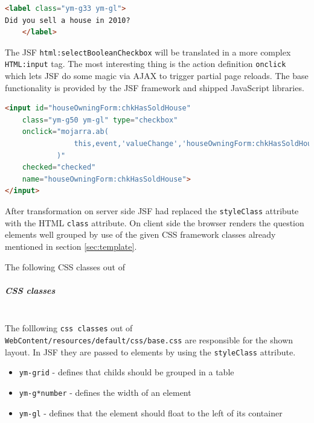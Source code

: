 \begin{lstlisting}[language=HTML]
<label class="ym-g33 ym-gl">
Did you sell a house in 2010?
    </label>
\end{lstlisting}

The JSF \texttt{html:selectBooleanCheckbox} will be translated in a more complex
\texttt{HTML:input} tag. The most interesting thing is the action definition
\texttt{onclick} which lets JSF do some magic via AJAX to trigger partial page
reloads. The base functionality is provided by the JSF framework and shipped
JavaScript libraries.

\begin{lstlisting}[language=HTML]
<input id="houseOwningForm:chkHasSoldHouse" 
	class="ym-g50 ym-gl" type="checkbox"
	onclick="mojarra.ab(
				this,event,'valueChange','houseOwningForm:chkHasSoldHouse','houseOwningForm:grp_hasSoldHouse_hasBoughtHouse'
			)"
	checked="checked" 
	name="houseOwningForm:chkHasSoldHouse">
</input>
\end{lstlisting}

After transformation on server side JSF had replaced the \texttt{styleClass}
attribute with the HTML \texttt{class} attribute. On client side the browser
renders the question elements well grouped by use of the given CSS framework
classes already mentioned in section \ref{sec:template}.

\begin{center}
\end{center}

The following CSS classes out of
\subparagraph{CSS classes}
$\;$ \\The folllowing \texttt{css classes} out of
\texttt{WebContent/resources/default/css/base.css} are responsible for the shown
layout. In JSF they are passed to elements by using the \texttt{styleClass}
attribute.

\begin{itemize}
  \item \texttt{ym-grid} - defines that childs should be grouped in a table
  \item \texttt{ym-g*number} - defines the width of an element
  \item \texttt{ym-gl} - defines that the element should float to the left of its
  container
\end{itemize}

